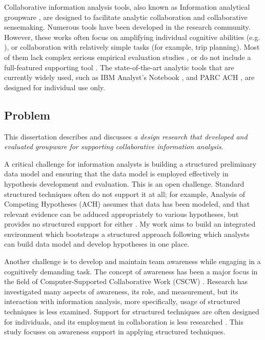 Collaborative information analysis tools, also known as Information analytical groupware \citep{Grudin1994e}, are designed to facilitate analytic collaboration and collaborative sensemaking.
Numerous tools have been developed in the research community. However, these works often focus on amplifying individual cognitive abilities (e.g. \cite{Stasko2008, Bier2008}), or collaboration with relatively simple tasks (for example, trip planning). Most of them lack complex serious empirical evaluation studies \citep{Goyal2016,Convertino2011}, or do not include a full-featured supporting tool \citep{Carroll2013,Borge2012}. The state-of-the-art analytic tools that are currently widely used, such as IBM Analyst's Notebook \citep{IBM}, and PARC ACH \citep{PARC}, are designed for individual use only. 

\subsection{Problem}

This dissertation describes and discusses \textit{a design research that developed and evaluated groupware for supporting collaborative information analysis}. 

A critical challenge for information analysts is building a structured preliminary data model and ensuring that the data model is employed effectively in hypothesis development and evaluation. This is an open challenge. Standard structured techniques often do not support it at all; for example, Analysis of Competing Hypotheses (ACH) assumes that data has been modeled, and that relevant evidence can be adduced appropriately to various hypotheses, but provides no structured support for either \citep{Gelder2008}. My work aims to build an integrated environment which bootstraps a structured approach following which analysts can build data model and develop hypotheses in one place. 

Another challenge is to develop and maintain team awareness while engaging in a cognitively demanding task. The concept of awareness has been a major focus in the field of Computer-Supported Collaborative Work (CSCW) \citep{Steinmacher2013a, Carroll2009i, Heath2002d}. Research has investigated many aspects of awareness, its role, and measurement, but its interaction with information analysis, more specifically, usage of structured techniques is less examined. Support for structured techniques are often designed for individuals, and its employment in collaboration is less researched \citep{Heuer2009}. This study focuses on awareness support in applying structured techniques.

